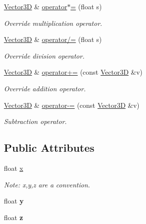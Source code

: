 \begin{DoxyCompactItemize}
\mbox{\hyperlink{struct_vector3_d}{Vector3D}} \& \mbox{\hyperlink{struct_vector3_d_a83d5f64613f79d60e080dc04689f1c2b}{operator$\ast$=}} (float s)
\begin{DoxyCompactList}\small\item\em Override multiplication operator. \end{DoxyCompactList}\item 
\mbox{\label{struct_vector3_d_a645dc0982d4fd81fc96ce56a6cc354a6}} 
\mbox{\hyperlink{struct_vector3_d}{Vector3D}} \& \mbox{\hyperlink{struct_vector3_d_a645dc0982d4fd81fc96ce56a6cc354a6}{operator/=}} (float s)
\begin{DoxyCompactList}\small\item\em Override division operator. \end{DoxyCompactList}\item 
\mbox{\label{struct_vector3_d_a66772c7b627b9722a911ba064d165c3e}} 
\mbox{\hyperlink{struct_vector3_d}{Vector3D}} \& \mbox{\hyperlink{struct_vector3_d_a66772c7b627b9722a911ba064d165c3e}{operator+=}} (const \mbox{\hyperlink{struct_vector3_d}{Vector3D}} \&v)
\begin{DoxyCompactList}\small\item\em Override addition operator. \end{DoxyCompactList}\item 
\mbox{\label{struct_vector3_d_a659cecf32e155fa6b6d97344a562df4d}} 
\mbox{\hyperlink{struct_vector3_d}{Vector3D}} \& \mbox{\hyperlink{struct_vector3_d_a659cecf32e155fa6b6d97344a562df4d}{operator-\/=}} (const \mbox{\hyperlink{struct_vector3_d}{Vector3D}} \&v)
\begin{DoxyCompactList}\small\item\em Subtraction operator. \end{DoxyCompactList}\end{DoxyCompactItemize}
\subsection*{Public Attributes}
\begin{DoxyCompactItemize}
\item 
float \mbox{\hyperlink{struct_vector3_d_aca5d15bdb846448e3cb73b072783f329}{x}}
\begin{DoxyCompactList}\small\item\em Note\+: x,y,z are a convention. \end{DoxyCompactList}\item 
\mbox{\label{struct_vector3_d_a9b6d194fcf526d7d4f9e902421285e94}} 
float {\bfseries y}
\item 
\mbox{\label{struct_vector3_d_af9728f1eba23b9ee091755346214f391}} 
float {\bfseries z}
\end{DoxyCompactItemize}


